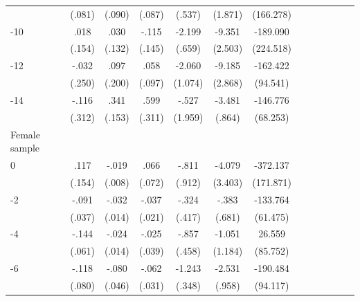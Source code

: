 \begin{table}[h]
\begin{adjustbox}{max width=\linewidth}
\begin{threeparttable}
{\begin{tabular}{l*{6}{SS}}
                &   (.081)         &   (.090)         &   (.087)         &   (.537)         &  (1.871)         &(166.278)         \\
-10            &     .018         &     .030         &    -.115         &   -2.199\sym{***}&   -9.351\sym{***}& -189.090         \\
                &   (.154)         &   (.132)         &   (.145)         &   (.659)         &  (2.503)         &(224.518)         \\
-12           &    -.032         &     .097         &     .058         &   -2.060         &   -9.185\sym{**} & -162.422         \\
                &   (.250)         &   (.200)         &   (.097)         &  (1.074)         &  (2.868)         & (94.541)         \\
-14           &    -.116         &     .341\sym{*}  &     .599         &    -.527         &   -3.481\sym{***}& -146.776\sym{*}  \\
                &   (.312)         &   (.153)         &   (.311)         &  (1.959)         &   (.864)         & (68.253)         \\
\midrule
Female sample &&&&&&\\
0               &     .117         &    -.019\sym{*}  &     .066         &    -.811         &   -4.079         & -372.137\sym{*}  \\
                &   (.154)         &   (.008)         &   (.072)         &   (.912)         &  (3.403)         &(171.871)         \\
-2             &    -.091\sym{*}  &    -.032\sym{*}  &    -.037         &    -.324         &    -.383         & -133.764\sym{*}  \\
                &   (.037)         &   (.014)         &   (.021)         &   (.417)         &   (.681)         & (61.475)         \\
-4             &    -.144\sym{*}  &    -.024         &    -.025         &    -.857         &   -1.051         &   26.559         \\
                &   (.061)         &   (.014)         &   (.039)         &   (.458)         &  (1.184)         & (85.752)         \\
-6             &    -.118         &    -.080         &    -.062\sym{*}  &   -1.243\sym{***}&   -2.531\sym{**} & -190.484\sym{*}  \\
                &   (.080)         &   (.046)         &   (.031)         &   (.348)         &   (.958)         & (94.117)         \\

\end{tabular}}
\end{threeparttable}
\end{adjustbox}
\end{table}
